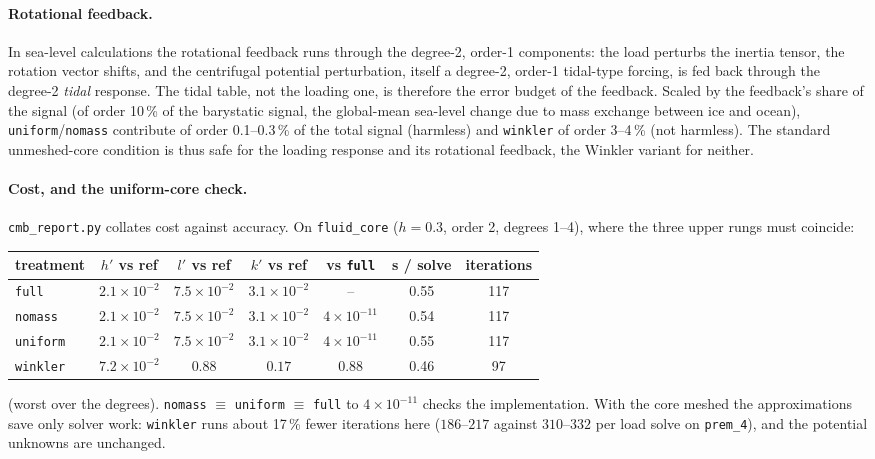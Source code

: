 \documentclass[11pt]{article}
\numberwithin{equation}{section}
\newcommand{\code}[1]{\texttt{#1}}
\begin{document}
\paragraph{Rotational feedback.} In sea-level calculations the rotational
feedback runs through the degree-2, order-1 components: the load perturbs
the inertia tensor, the rotation vector shifts, and the centrifugal
potential perturbation, itself a degree-2, order-1 tidal-type forcing, is
fed back through the degree-2 \emph{tidal} response. The tidal table, not
the loading one, is therefore the error budget of the feedback. Scaled by
the feedback's share of the signal (of order 10\,\% of the barystatic
signal, the global-mean sea-level change due to mass exchange between ice
and ocean), \code{uniform}/\code{nomass} contribute of order 0.1--0.3\,\%
of the total signal (harmless) and \code{winkler} of order 3--4\,\% (not
harmless). The standard unmeshed-core condition is thus safe for the
loading response and its rotational feedback, the Winkler variant for
neither.

\paragraph{Cost, and the uniform-core check.} \code{cmb\_report.py}
collates cost against accuracy. On \code{fluid\_core} ($h=0.3$, order 2,
degrees 1--4), where the three upper rungs must coincide:
\begin{center}
\small
\begin{tabular}{@{}lcccccc@{}}
\toprule
treatment & $h'$ vs ref & $l'$ vs ref & $k'$ vs ref & vs \code{full} & s / solve & iterations \\
\midrule
\code{full} & $2.1\times10^{-2}$ & $7.5\times10^{-2}$ & $3.1\times10^{-2}$ & -- & 0.55 & 117 \\
\code{nomass} & $2.1\times10^{-2}$ & $7.5\times10^{-2}$ & $3.1\times10^{-2}$ & $4\times10^{-11}$ & 0.54 & 117 \\
\code{uniform} & $2.1\times10^{-2}$ & $7.5\times10^{-2}$ & $3.1\times10^{-2}$ & $4\times10^{-11}$ & 0.55 & 117 \\
\code{winkler} & $7.2\times10^{-2}$ & $0.88$ & $0.17$ & $0.88$ & 0.46 & 97 \\
\bottomrule
\end{tabular}
\end{center}
(worst over the degrees). \code{nomass} $\equiv$ \code{uniform} $\equiv$
\code{full} to $4\times10^{-11}$ checks the implementation. With the core
meshed the approximations save only solver work: \code{winkler} runs about
17\,\% fewer iterations here ($186$--$217$ against $310$--$332$ per load
solve on \code{prem\_4}), and the potential unknowns are unchanged.
\end{document}

